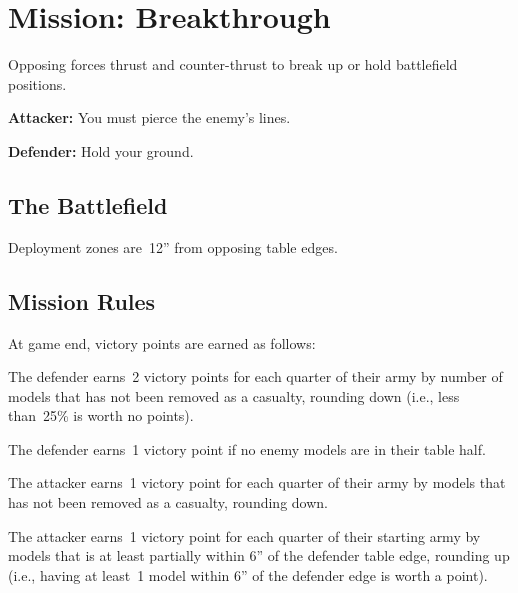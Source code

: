 \clearpage
\section{Mission: Breakthrough}

  Opposing forces thrust and counter-thrust to break up or hold
  battlefield positions.
  \begin{squishitemize}
  \item {\bf Attacker:} You must pierce the enemy's lines.
  \item {\bf Defender:} Hold your ground.
  \end{squishitemize}

\subsection{\bf The Battlefield}%

Deployment zones are~12'' from opposing table edges.

\subsection{\bf Mission Rules}%

At game end, victory points are earned as follows:

\begin{squishitemize}
\item The defender earns~2 victory points for each quarter of their
  army by number of models that has not been removed as a casualty,
  rounding down (i.e., less than~25\% is worth no points).

\item The defender earns~1 victory point if no enemy models are in
  their table half.

\item The attacker earns~1 victory point for each quarter of their
  army by models that has not been removed as a casualty, rounding
  down.

\item The attacker earns~1 victory point for each quarter of their
  starting army by models that is at least partially within 6'' of the
  defender table edge, rounding up (i.e., having at least~1 model
  within 6'' of the defender edge is worth a point).

\end{squishitemize}


